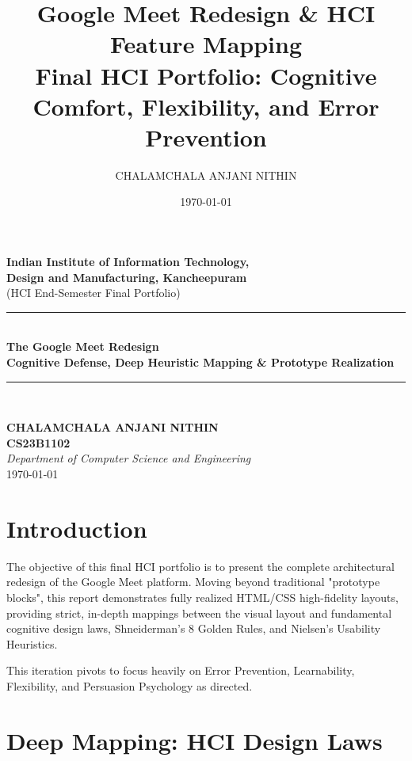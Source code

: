 \documentclass[12pt,a4paper]{article}
\title{\textbf{Google Meet Redesign \& HCI Feature Mapping}\\
\large Final HCI Portfolio: Cognitive Comfort, Flexibility, and Error Prevention}
\author{CHALAMCHALA ANJANI NITHIN}
\date{\today}
\begin{document}
\begin{titlepage}
\begin{center}

{\LARGE \textbf{Indian Institute of Information Technology,\\
Design and Manufacturing, Kancheepuram}}\\[1.5cm]

{\large (HCI End-Semester Final Portfolio)}\\[3cm]

\rule{\linewidth}{0.5pt}\\[0.4cm]
{\Huge \textbf{The Google Meet Redesign}}\\[0.3cm]
{\Large \textbf{Cognitive Defense, Deep Heuristic Mapping \& Prototype Realization}}\\[0.3cm]
\rule{\linewidth}{0.5pt}\\[2cm]

\vfill

\textbf{CHALAMCHALA ANJANI NITHIN}\\[0.2cm]
\textbf{CS23B1102}\\[0.2cm]
\textit{Department of Computer Science and Engineering}\\[0.5cm]

{\large \today}

\end{center}
\end{titlepage}

\newpage
\tableofcontents
\newpage

\section{Introduction}

The objective of this final HCI portfolio is to present the complete architectural redesign of the Google Meet platform. Moving beyond traditional "prototype blocks", this report demonstrates fully realized HTML/CSS high-fidelity layouts, providing strict, in-depth mappings between the visual layout and fundamental cognitive design laws, Shneiderman's 8 Golden Rules, and Nielsen's Usability Heuristics.

This iteration pivots to focus heavily on Error Prevention, Learnability, Flexibility, and Persuasion Psychology as directed.

\section{Deep Mapping: HCI Design Laws}
\end{document}
